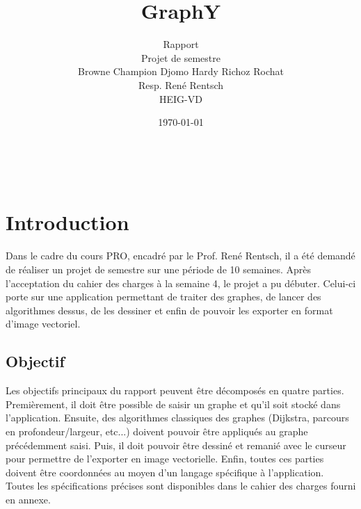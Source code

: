 \documentclass[french]{article}
\begin{document}
	
	
	\title{GraphY} %
	\author{Rapport\\ 
		Projet de semestre\\
		Browne Champion Djomo Hardy Richoz Rochat\\
		Resp. René Rentsch\\
		HEIG-VD}
	\date{\today} %
	\maketitle
	\thispagestyle{empty}
	
	\newpage
	\thispagestyle{empty}
	$ $
	\newpage
	

	
	\tableofcontents
	

	
	\justify
	\normalsize
	
	\section{Introduction}
	Dans le cadre du cours PRO, encadré par le Prof. René Rentsch, il a été demandé de réaliser un projet de semestre sur une période de 10 semaines. Après l'acceptation du cahier des charges à la semaine 4, le projet a pu débuter. Celui-ci porte sur une application permettant de traiter des graphes, de lancer des algorithmes dessus, de les dessiner et enfin de pouvoir les exporter en format d'image vectoriel.
	
		\subsection{Objectif}
		Les objectifs principaux du rapport peuvent être décomposés en quatre parties. Premièrement, il doit être possible de saisir un graphe et qu'il soit stocké dans l'application. Ensuite, des algorithmes classiques des graphes (Dijkstra, parcours en profondeur/largeur, etc...) doivent pouvoir être appliqués au graphe précédemment saisi. Puis, il doit pouvoir être dessiné et remanié avec le curseur pour permettre de l'exporter en image vectorielle. Enfin, toutes ces parties doivent être coordonnées au moyen d'un langage spécifique à l'application.\\
		Toutes les spécifications précises sont disponibles dans le cahier des charges fourni en annexe.
		
\end{document}
